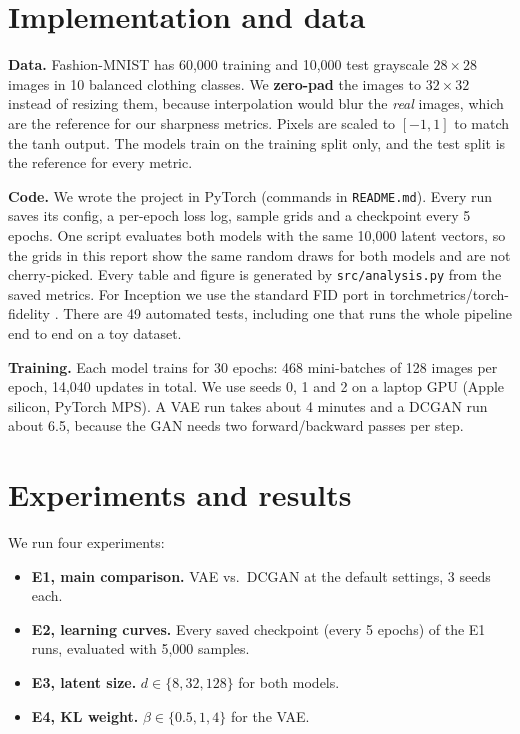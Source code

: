 \documentclass[11pt,letterpaper]{article}
\begin{document}
\section{Implementation and data}\label{sec:implementation}

\textbf{Data.} Fashion-MNIST \cite{xiao2017} has 60,000 training and
10,000 test grayscale \(28 \times 28\) images in 10 balanced clothing
classes. We \textbf{zero-pad} the images to \(32 \times 32\) instead of
resizing them, because interpolation would blur the \emph{real} images,
which are the reference for our sharpness metrics. Pixels are scaled to
\([-1, 1]\) to match the tanh output. The models train on the training
split only, and the test split is the reference for every metric.

\textbf{Code.} We wrote the project in PyTorch (commands in
\texttt{README.md}). Every run saves its config, a per-epoch loss log,
sample grids and a checkpoint every 5 epochs. One script evaluates both
models with the same 10,000 latent vectors, so the grids in this report
show the same random draws for both models and are not cherry-picked.
Every table and figure is generated by \texttt{src/analysis.py} from the
saved metrics. For Inception we use the standard FID port in
torchmetrics/torch-fidelity \cite{torchmetrics}. There are 49 automated
tests, including one that runs the whole pipeline end to end on a toy
dataset.

\textbf{Training.} Each model trains for 30 epochs: 468 mini-batches of
128 images per epoch, 14,040 updates in total. We use seeds 0, 1 and 2
on a laptop GPU (Apple silicon, PyTorch MPS). A VAE run takes about 4
minutes and a DCGAN run about 6.5, because the GAN needs two
forward/backward passes per step.

\section{Experiments and results}\label{sec:experiments}

We run four experiments:

\begin{itemize}

\item
  \textbf{E1, main comparison.} VAE vs.~DCGAN at the default settings, 3
  seeds each.
\item
  \textbf{E2, learning curves.} Every saved checkpoint (every 5 epochs)
  of the E1 runs, evaluated with 5,000 samples.
\item
  \textbf{E3, latent size.} \(d\in\{8,32,128\}\) for both models.
\item
  \textbf{E4, KL weight.} \(\beta\in\{0.5,1,4\}\) for the VAE.
\end{itemize}
\end{document}
